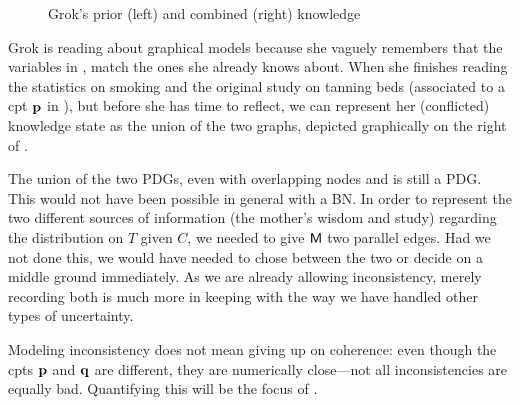 \documentclass{article}
\newcommand{\MN}{PDG}
\newcommand{\MNs}{\MN s}
\numberwithin{equation}{section}
\begin{document}
\begin{example}
\begin{figure}
{
			}
			
			\caption{\small Grok's prior (left) and combined (right) knowledge}
			\label{fig:grok-combine}
		\end{figure}
		
		Grok is reading about graphical models because she vaguely remembers that the variables in , match the ones she already knows about. When she finishes reading the statistics on smoking and the original study on tanning beds (associated to a cpt $\mathbf p$ in ), but before she has time to reflect, we can represent her (conflicted) knowledge state as the union of the two graphs, depicted graphically on the right of . 
	 
		The union of the two \MNs, even with overlapping nodes and is still a \MN. This would not have been possible in general with a BN. In order to represent the two different sources of information (the mother's wisdom and study) regarding the distribution on $T$ given $C$,  we needed to give $\sf M$ two parallel edges. Had we not done this, we would have needed to chose between the two or decide on a middle ground immediately. As we are already allowing inconsistency, merely recording both is much more in keeping with the way we have handled other types of uncertainty.
	\end{example}
	Modeling inconsistency does not mean giving up on coherence: even though the cpts $\mathbf p$ and $\mathbf q$ are different, they are numerically close---not all inconsistencies are equally bad. Quantifying this will be the focus of . 
	
\end{document}
